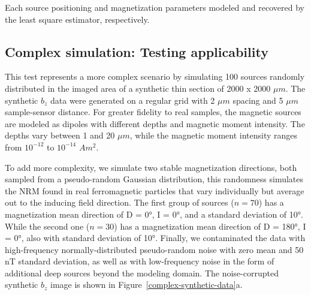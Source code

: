 \begin{table}[t]
  \begin{center}
    \small
    
  \end{center}
  \caption{Each source positioning and magnetization parameters modeled and recovered by the least square estimator, respectively.}
  \label{tab_synthetic_simple_results}
\end{table}


\subsection{Complex simulation: Testing applicability}

This test represents a more complex scenario by simulating 100 sources randomly distributed in the imaged area of a synthetic thin section of 2000 x 2000 $\mu m$. The synthetic $b_z$ data were generated on a regular grid with 2 $\mu m$ spacing and 5 $\mu m$ sample-sensor distance. For greater fidelity to real samples, the magnetic sources are modeled as dipoles with different depths and magnetic moment intensity. The depths vary between 1 and 20 $\mu m$, while the magnetic moment intensity ranges from $10^{-12}$ to $10^{-14}$ $Am^2$. 

To add more complexity, we simulate two stable magnetization  directions, both sampled from a pseudo-random Gaussian distribution, this randomness simulates the NRM found in real ferromagnetic particles that vary individually but average out to the inducing field direction. The first group of sources ($n = 70$) has a magnetization mean direction of D = 0°, I = 0°, and a standard deviation of 10°. While the second one ($n = 30$) has a magnetization mean direction of D = 180°, I = 0°, also with standard deviation of 10°. Finally, we contaminated the data with high-frequency normally-distributed pseudo-random noise with zero mean and 50 nT standard deviation, as well as with low-frequency noise in the form of additional deep sources beyond the modeling domain. The noise-corrupted synthetic $b_z$ image is shown in Figure~\ref{complex-synthetic-data}a.

